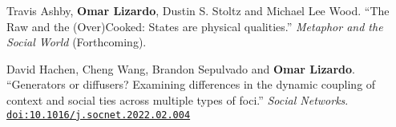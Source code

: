 

\ind Travis Ashby, {\bf Omar Lizardo}, Dustin S. Stoltz and Michael Lee Wood. ``The Raw and the (Over)Cooked: States are physical qualities.'' {\em Metaphor and the Social World} (Forthcoming). 

\ind David Hachen, Cheng Wang, Brandon Sepulvado and {\bf Omar Lizardo}. ``Generators or diffusers? Examining differences in the dynamic coupling of context and social ties across multiple types of foci.'' {\em Social Networks}. \href{https://doi.org/10.1016/j.socnet.2022.02.004}{\nolinkurl{doi:10.1016/j.socnet.2022.02.004}}

